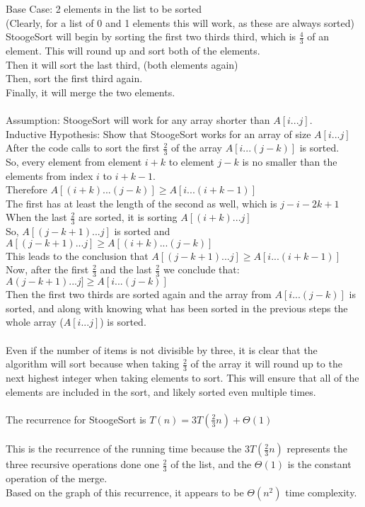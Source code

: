 \documentclass[11pt]{article}
\begin{document}
\begin{enumerate}
Base Case: 2 elements in the list to be sorted\\
(Clearly, for a list of 0 and 1 elements this will work, as these are always sorted)\\
StoogeSort will begin by sorting the first two thirds third, which is $\frac{4}{3}$ of an element. This will round up and sort both of the elements. \\
Then it will sort the last third, (both elements again) \\
Then, sort the first third again. \\
Finally, it will merge the two elements. \\\\
Assumption: StoogeSort will work for any array shorter than $A[i...j]$.\\
Inductive Hypothesis: Show that StoogeSort works for an array of size $A[i...j]$\\
After the code calls to sort the first $\frac{2}{3}$ of the array $A[i...(j-k)]$ is sorted.\\
So, every element from element $i+k$ to element $j-k$ is no smaller than the elements from index $i$ to $i+k-1$.\\
Therefore $A[(i+k)...(j-k)]\geq A[i...(i+k-1)]$\\
The first has at least the length of the second as well, which is $j-i-2k+1$\\
When the last $\frac{2}{3}$ are sorted, it is sorting $A[(i+k)...j]$\\
So, $A[(j-k+1)...j]$ is sorted and $A[(j-k+1)...j]\geq A[(i+k)...(j-k)]$\\
This leads to the conclusion that $A[(j-k+1)...j]\geq A[i...(i+k-1)]$\\
Now, after the first $\frac{2}{3}$ and the last $\frac{2}{3}$ we conclude that:\\
$A(j-k+1)...j]\geq A[i...(j-k)]$\\
Then the first two thirds are sorted again and the array from $A[i...(j-k)]$ is sorted, and along with knowing what has been sorted in the previous steps the whole array ($A[i...j]$) is sorted. \\\\
Even if the number of items is not divisible by three, it is clear that the algorithm will sort because when taking $\frac{2}{3}$ of the array it will round up to the next highest integer when taking elements to sort. This will ensure that all of the elements are included in the sort, and likely sorted even multiple times. \\\\
The recurrence for StoogeSort is $T(n) = 3T(\frac{2}{3}n)+\Theta (1)$\\\\
This is the recurrence of the running time because the $3T(\frac{2}{3}n)$ represents the three recursive operations done one $\frac{2}{3}$ of the list, and the $\Theta(1)$ is the constant operation of the merge. \\
Based on the graph of this recurrence, it appears to be $\Theta(n^2)$ time complexity.\\



\end{enumerate}
\end{document}
